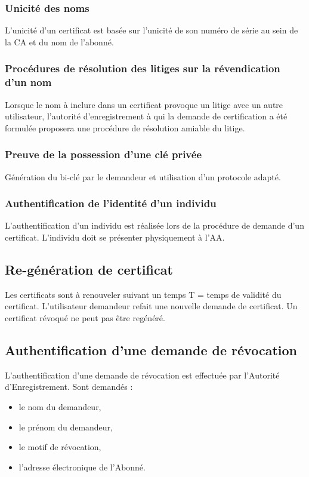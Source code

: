 \documentclass[a4paper,11pt,french]{book}
\begin{document}
\subsubsection{Unicité des noms}
L’unicité d’un certificat est basée sur l’unicité de son numéro de série au sein de la CA et du nom de l'abonné.

\subsubsection{Procédures de résolution des litiges sur la révendication d'un nom}
Lorsque le nom à inclure dans un certificat provoque un litige avec un autre utilisateur, l’autorité d’enregistrement à qui la demande de certification a été formulée proposera une procédure de résolution amiable du litige.

\subsubsection{Preuve de la possession d'une clé privée}
Génération du bi-clé par le demandeur et utilisation d'un protocole adapté.

\subsubsection{Authentification de l'identité d'un individu}
L'authentification d'un individu est réalisée lors de la procédure de demande d'un certificat. L'individu doit se présenter physiquement à l'AA.

\subsection{Re-génération de certificat}
Les certificats sont à renouveler suivant un temps T = temps de validité du certificat. L'utilisateur demandeur refait une nouvelle demande de certificat. Un certificat révoqué ne peut pas être regénéré.
\subsection{Authentification d'une demande de révocation}
L'authentification d'une demande de révocation est effectuée par l'Autorité d'Enregistrement.
Sont demandés :
\begin{itemize}
\item le nom du demandeur,
\item le prénom du demandeur,
\item le motif de révocation,
\item l’adresse électronique de l'Abonné.
\end{itemize}
\end{document}
